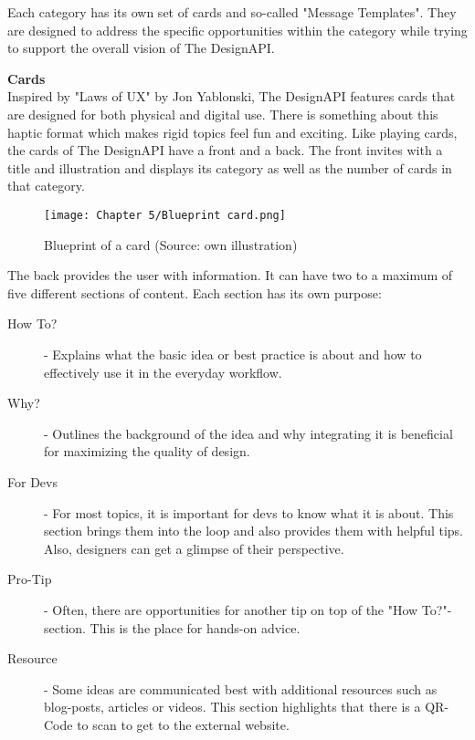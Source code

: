 Each category has its own set of cards and so-called "Message Templates". They are designed to
address the specific opportunities within the category while trying to support the overall vision of
The DesignAPI.

\textbf{Cards}\\
Inspired by "Laws of UX" by Jon Yablonski, The DesignAPI features cards that are designed for both
physical and digital use. There is something about this haptic format which makes rigid topics feel
fun and exciting. Like playing cards, the cards of The DesignAPI have a front and a back. The front
invites with a title and illustration and displays its category as well as the number of cards in
that category.

\begin{figure}[H]
      \centering
      \texttt{[image: Chapter 5/Blueprint card.png]}
      \caption{Blueprint of a card (Source: own illustration)}
\end{figure}

The back provides the user with information. It can have two to a maximum of five different sections
of content. Each section has its own purpose:

\begin{description}
      \item[How To?] - Explains what the basic idea or best practice is about and how to
            effectively use it in the everyday workflow.

      \item[Why?] - Outlines the background of the idea and why integrating it is beneficial for
            maximizing the quality of design.

      \item[For Devs] - For most topics, it is important for devs to know what it is about. This
            section brings them into the loop and also provides them with helpful tips. Also,
            designers can get a glimpse of their perspective.

      \item[Pro-Tip] - Often, there are opportunities for another tip on top of the "How To?"-section.
            This is the place for hands-on advice.

      \item[Resource] - Some ideas are communicated best with additional resources such as blog-posts,
            articles or videos. This section highlights that there is a QR-Code to scan to get to the
            external website.
\end{description}

